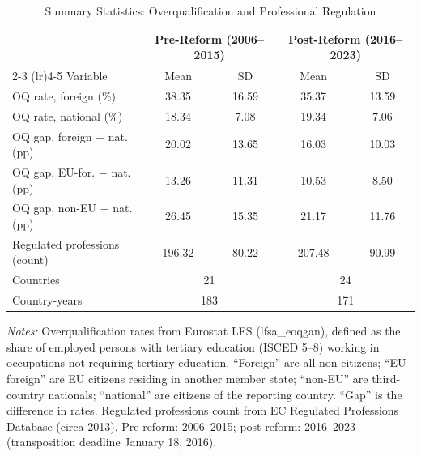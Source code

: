 \begin{table}[t]
\centering
\caption{Summary Statistics: Overqualification and Professional Regulation}
\label{tab:summary}
\small
\begin{tabular}{lcccc}
\toprule
 & \multicolumn{2}{c}{Pre-Reform (2006--2015)} & \multicolumn{2}{c}{Post-Reform (2016--2023)} \\
\cmidrule(lr){2-3} \cmidrule(lr){4-5}
Variable & Mean & SD & Mean & SD \\
\midrule
OQ rate, foreign (\%) & 38.35 & 16.59 & 35.37 & 13.59 \\
OQ rate, national (\%) & 18.34 & 7.08 & 19.34 & 7.06 \\
OQ gap, foreign $-$ nat. (pp) & 20.02 & 13.65 & 16.03 & 10.03 \\
OQ gap, EU-for. $-$ nat. (pp) & 13.26 & 11.31 & 10.53 & 8.50 \\
OQ gap, non-EU $-$ nat. (pp) & 26.45 & 15.35 & 21.17 & 11.76 \\
Regulated professions (count) & 196.32 & 80.22 & 207.48 & 90.99 \\
\midrule
Countries & \multicolumn{2}{c}{21} & \multicolumn{2}{c}{24} \\
Country-years & \multicolumn{2}{c}{183} & \multicolumn{2}{c}{171} \\
\bottomrule
\end{tabular}
\vspace{0.3em}
\parbox{\textwidth}{\footnotesize\sloppy \textit{Notes:} Overqualification rates from Eurostat LFS (lfsa\_eoqgan), defined as the share of employed persons with tertiary education (ISCED 5--8) working in occupations not requiring tertiary education. ``Foreign'' are all non-citizens; ``EU-foreign'' are EU citizens residing in another member state; ``non-EU'' are third-country nationals; ``national'' are citizens of the reporting country. ``Gap'' is the difference in rates. Regulated professions count from EC Regulated Professions Database (circa 2013). Pre-reform: 2006--2015; post-reform: 2016--2023 (transposition deadline January 18, 2016).}
\end{table}
